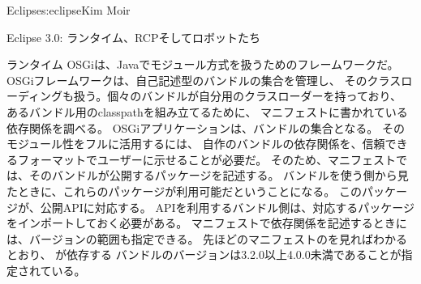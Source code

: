 \begin{aosachapter}{Eclipse}{s:eclipse}{Kim Moir}
\begin{aosasect1}{Eclipse 3.0: ランタイム、RCPそしてロボットたち}
\begin{aosasect2}{ランタイム}
OSGiは、Javaでモジュール方式を扱うためのフレームワークだ。
OSGiフレームワークは、自己記述型のバンドルの集合を管理し、
そのクラスローディングも扱う。個々のバンドルが自分用のクラスローダーを持っており、
あるバンドル用のclasspathを組み立てるために、
マニフェストに書かれている依存関係を調べる。
OSGiアプリケーションは、バンドルの集合となる。
そのモジュール性をフルに活用するには、
自作のバンドルの依存関係を、信頼できるフォーマットでユーザーに示せることが必要だ。
そのため、マニフェストでは、そのバンドルが公開するパッケージを記述する。
バンドルを使う側から見たときに、これらのパッケージが利用可能だということになる。
このパッケージが、公開APIに対応する。
APIを利用するバンドル側は、対応するパッケージをインポートしておく必要がある。
マニフェストで依存関係を記述するときには、バージョンの範囲も指定できる。
先ほどのマニフェストのを見ればわかるとおり、
が依存する
バンドルのバージョンは3.2.0以上4.0.0未満であることが指定されている。



\end{aosasect2}
\end{aosasect1}
\end{aosachapter}

